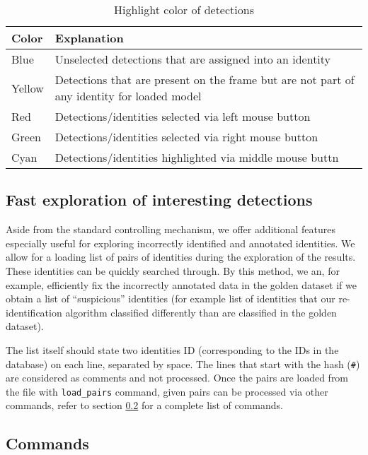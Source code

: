 \begin{table}[]
    \centering
    \begin{tabularx}{\textwidth}{l|X}
         \textbf{Color} & \textbf{Explanation} \\ \hline
         Blue & Unselected detections that are assigned into an identity \\ \hline
         Yellow & Detections that are present on the frame but are not part of any
         identity for loaded model \\ \hline
         Red & Detections/identities selected via left mouse button \\ \hline
         Green & Detections/identities selected via right mouse button \\ \hline
         Cyan & Detections/identities highlighted via middle mouse buttn \\
    \end{tabularx}
    \caption{Highlight color of detections}
    \label{tab:annotation_highlight}
\end{table}

\subsection{Fast exploration of interesting detections}

\label{subsec:exploration}

Aside from the standard controlling mechanism, we offer additional features especially
useful for exploring incorrectly identified and annotated identities. We allow
for a loading list of pairs of identities during the exploration of the results. These
identities can be quickly searched through. By this method, we an, for example, efficiently fix the incorrectly annotated data in the golden dataset if we obtain a list of ``suspicious'' identities (for example list of identities that our re-identification algorithm classified differently than are classified in the golden dataset).

The list itself should state two identities ID (corresponding to the IDs in the
database) on each line, separated by space. The lines that start with the hash (\verb+#+) are considered as comments and not processed. Once the pairs are loaded
from the file with \verb+load_pairs+ command, given pairs can be processed via other
commands, refer to section \ref{sec:commands} for a complete list of commands.

\subsection{Commands}
\label{sec:commands}

